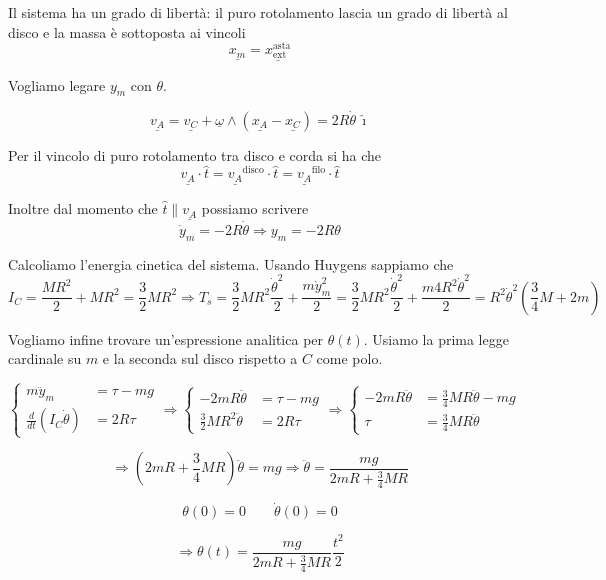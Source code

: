 \begin{example}{}
\begin{center}
\end{center}


Il sistema ha un grado di libertà: il puro rotolamento lascia un grado di libertà al disco e la massa è sottoposta ai vincoli
\[
\underline{x_m}=\underline{x_{\text{ext}}^{\text{asta}}}
\]

Vogliamo legare \(y_m\) con \(\theta\).

\[
\underline{v_A}=\underline{v_C}+\underline{\omega}\wedge(\underline{x_A}-\underline{x_C})=2R\dot{\theta}\,\hat{\imath}
\]

Per il vincolo di puro rotolamento tra disco e corda si ha che
\[
\underline{v_A}\cdot\hat{t}=\underline{v_A}^{\text{disco}}\cdot\hat{t}=\underline{v_A}^{\text{filo}}\cdot\hat{t}
\]

Inoltre dal momento che \(\hat{t}\parallel \underline{v_A}\) possiamo scrivere
\[
\dot{y}_m=-2R\dot{\theta}\Rightarrow y_m=-2R\theta
\]

Calcoliamo l'energia cinetica del sistema. Usando Huygens sappiamo che
\[
I_C=\frac{MR^2}{2}+MR^2=\frac{3}{2}MR^2 \Rightarrow T_s=\frac{3}{2}MR^2\frac{\dot{\theta}^2}{2}+\frac{m\dot{y}_m^2}{2}=\frac{3}{2}MR^2\frac{\dot{\theta}^2}{2}+\frac{m4R^2\dot{\theta}^2}{2}=R^2\dot{\theta}^2\left(\frac{3}{4}M+2m\right)
\]

Vogliamo infine trovare un'espressione analitica per \(\theta(t)\). Usiamo la prima legge cardinale su \(m\) e la seconda sul disco rispetto a \(C\) come polo.

\[
\left\{
\begin{aligned}
m\ddot{y}_m&=\tau-mg\\
\frac{d}{dt}(I_C\dot{\theta})&=2R\tau
\end{aligned}
\right.
\Rightarrow
\left\{
\begin{aligned}
-2mR\ddot{\theta}&=\tau-mg\\
\frac{3}{2}MR^2\ddot{\theta}&=2R\tau
\end{aligned}
\right.
\Rightarrow
\left\{
\begin{aligned}
-2mR\ddot{\theta}&=\frac{3}{4}MR\ddot{\theta}-mg\\
\tau&=\frac{3}{4}MR\ddot{\theta}
\end{aligned}
\right.
\]

\[
\Rightarrow \left(2mR+\frac{3}{4}MR\right)\ddot{\theta}=mg \Rightarrow \ddot{\theta}=\frac{mg}{2mR+\frac{3}{4}MR}
\]

\[
\theta(0)=0
\qquad
\dot{\theta}(0)=0
\]

\[
\Rightarrow \theta(t)=\frac{mg}{2mR+\frac{3}{4}MR}\frac{t^2}{2}
\]
\end{example}

